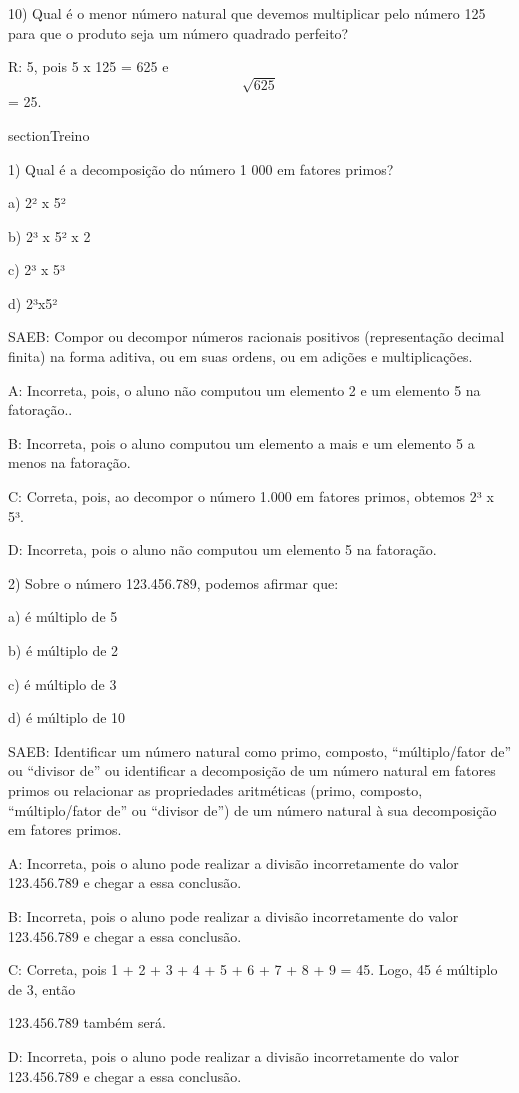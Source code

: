 10) Qual é o menor número natural que devemos multiplicar pelo número
125 para que o produto seja um número quadrado perfeito?

R: 5, pois 5 x 125 = 625 e \[\sqrt{625}\] = 25.

section{Treino}

1) Qual é a decomposição do número 1 000 em fatores primos?

a) 2² x 5²

b) 2³ x 5² x 2

c) 2³ x 5³

d) 2³x5²

SAEB: Compor ou decompor números racionais positivos (representação
decimal finita) na forma aditiva, ou em suas ordens, ou em adições e
multiplicações.

A: Incorreta, pois, o aluno não computou um elemento 2 e um elemento 5
na fatoração..

B: Incorreta, pois o aluno computou um elemento a mais e um elemento 5 a
menos na fatoração.

C: Correta, pois, ao decompor o número 1.000 em fatores primos, obtemos
2³ x 5³.

D: Incorreta, pois o aluno não computou um elemento 5 na fatoração.

2) Sobre o número 123.456.789, podemos afirmar que:

a) é múltiplo de 5

b) é múltiplo de 2

c) é múltiplo de 3

d) é múltiplo de 10

SAEB: Identificar um número natural como primo, composto,
``múltiplo/fator de'' ou ``divisor de'' ou identificar a decomposição de
um número natural em fatores primos ou relacionar as propriedades
aritméticas (primo, composto, ``múltiplo/fator de'' ou ``divisor de'')
de um número natural à sua decomposição em fatores primos.

A: Incorreta, pois o aluno pode realizar a divisão incorretamente do
valor 123.456.789 e chegar a essa conclusão.

B: Incorreta, pois o aluno pode realizar a divisão incorretamente do
valor 123.456.789 e chegar a essa conclusão.

C: Correta, pois 1 + 2 + 3 + 4 + 5 + 6 + 7 + 8 + 9 = 45. Logo, 45 é
múltiplo de 3, então

123.456.789 também será.

D: Incorreta, pois o aluno pode realizar a divisão incorretamente do
valor 123.456.789 e chegar a essa conclusão.

